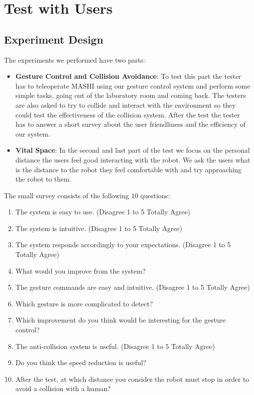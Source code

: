 \section{Test with Users}
\label{sec:test}

\subsection{Experiment Design}
The experiments we performed have two parts:\\

\begin{itemize}
	\item \textbf{Gesture Control and Collision Avoidance}: To test this part the tester has to teleoperate MASHI using our gesture control system and perform some simple tasks, going out of the laboratory room and coming back. The testers are also asked to try to collide and interact with the environment so they could test the effectiveness of the collision system. After the test the tester has to answer a short survey about the user friendliness and the efficiency of our system.
	
	\item \textbf{Vital Space}: In the second and last part of the test we focus on the personal distance the users feel good interacting with the robot. We ask the users what is the distance to the robot they feel comfortable with and try approaching the robot to them.
\end{itemize}

The small survey consists of the following 10 questions:

\begin{enumerate}
	\item The system is easy to use. (Disagree 1 to 5 Totally Agree)
	\item The system is intuitive. (Disagree 1 to 5 Totally Agree)
	\item The system responds accordingly to your expectations. (Disagree 1 to 5 Totally Agree)
	\item What would you improve from the system?
	\item The gesture commands are easy and intuitive. (Disagree 1 to 5 Totally Agree)
	\item Which gesture is more complicated to detect?
	\item Which improvement do you think would be interesting for the gesture control?
	\item The anti-collision system is useful. (Disagree 1 to 5 Totally Agree)
	\item Do you think the speed reduction is useful?
	\item After the test, at which distance you consider the robot must stop in order to avoid a collision with a human?
\end{enumerate}






